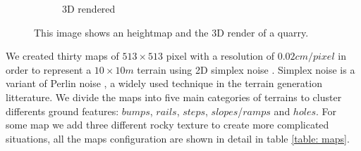 \documentclass[../document.tex]{subfiles}
\begin{document}
\begin{figure}[htbp]
\begin{subfigure}[b]{0.45\linewidth}
            \caption{3D rendered}
            \end{subfigure}    
    \caption{This image shows an heightmap and the 3D render of a quarry.}
    \end{figure}
We created thirty maps of $513\times513$ pixel with a resolution of $0.02cm/pixel$ in order to represent a $10\times10m$ terrain using 2D simplex noise \cite{simplex}. Simplex noise is a variant of Perlin noise \cite{perlin}, a widely used technique in the terrain generation litterature. 
We divide the maps into five main categories of terrains to cluster differents ground features: $bumps$, $rails$, $steps$, $slopes$/$ramps$ and $holes$. For some map we add three different rocky texture to create more complicated situations, all the maps configuration are shown in detail in table \ref{table: maps}.
\end{document}

